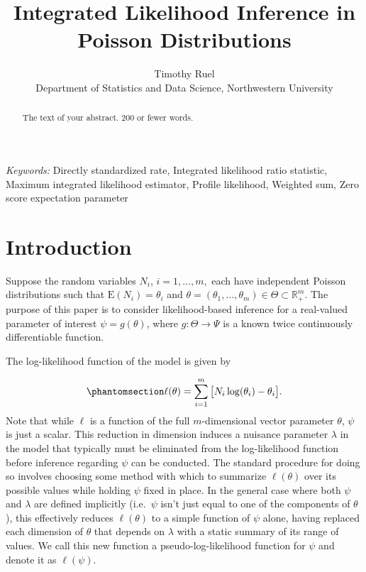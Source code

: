 \documentclass[
  12pt]{article}
\begin{document}
\def\spacingset#1{\renewcommand{\baselinestretch}%
{#1}\small\normalsize} \spacingset{1}



\title{\bf Integrated Likelihood Inference in Poisson Distributions}
\author{
Timothy Ruel\\
Department of Statistics and Data Science, Northwestern University\\
}
\maketitle

\bigskip
\bigskip
\begin{abstract}
The text of your abstract. 200 or fewer words.
\end{abstract}

\noindent%
{\it Keywords:} Directly standardized rate, Integrated likelihood ratio
statistic, Maximum integrated likelihood estimator, Profile
likelihood, Weighted sum, Zero score expectation parameter
\vfill

\newpage
\spacingset{1.9} %

\section{Introduction}\label{sec-intro}

Suppose the random variables \(N_i\), \(i = 1, ..., m,\) each have
independent Poisson distributions such that \(\text{E}(N_i) = \theta_i\)
and
\(\theta = (\theta_1, ..., \theta_m) \in \Theta \subset \mathbb{R}^m_+\).
The purpose of this paper is to consider likelihood-based inference for
a real-valued parameter of interest \(\psi = g(\theta)\), where
\(g: \Theta \to \Psi\) is a known twice continuously differentiable
function.

The log-likelihood function of the model is given by

\begin{equation}\phantomsection\label{eq-1}{
\ell(\theta) = \sum_{i=1}^m \big[N_i \log(\theta_i) - \theta_i\big].
}\end{equation} Note that while \(\ell\) is a function of the full
\(m\)-dimensional vector parameter \(\theta\), \(\psi\) is just a
scalar. This reduction in dimension induces a nuisance parameter
\(\lambda\) in the model that typically must be eliminated from the
log-likelihood function before inference regarding \(\psi\) can be
conducted. The standard procedure for doing so involves choosing some
method with which to summarize \(\ell(\theta)\) over its possible values
while holding \(\psi\) fixed in place. In the general case where both
\(\psi\) and \(\lambda\) are defined implicitly (i.e.~\(\psi\) isn't
just equal to one of the components of \(\theta\)), this effectively
reduces \(\ell(\theta)\) to a simple function of \(\psi\) alone, having
replaced each dimension of \(\theta\) that depends on \(\lambda\) with a
static summary of its range of values. We call this new function a
pseudo-log-likelihood function for \(\psi\) and denote it as
\(\ell(\psi)\).
\end{document}
